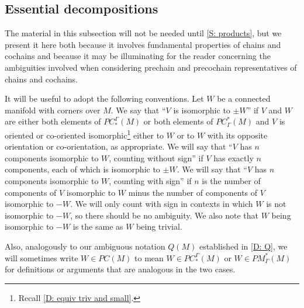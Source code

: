 \begin{comment}
	For the third product, we have by Joyce's convention that \red{I'm not getting a simple description of this because of Joyce's desription.
		Note that it requires using a specific identification of $TV \oplus TW$ with $TP \oplus TM$.
		I compute that even if we use identify $TM = \nu W \oplus TP \oplus \nu V$, $TV = \nu W \oplus TP$, and $TW = TP \oplus \nu V \oplus TP$ consistently, there's a sign of $(-1)^{m-w}$ from the determinant of Joyce's isomorphism, and then he enforces another factor of $(-1)^{mw}$ by hand.
		Yuck.
		And this is before comparing the actual orientations of things - yuck.
		We'll have to think some more about this.
	}.
\end{comment}


\subsection{Essential decompositions}\label{S: essential decomp}

The material in this subsection will not be needed until \cref{S: products}, but we present it here both because it involves fundamental properties of chains and cochains and because it may be illuminating for the reader concerning the ambiguities involved when considering prechain and precochain representatives of chains and cochains.


It will be useful to adopt the following conventions.
Let $W$ be a connected manifold with corners over $M$.
We say that ``$V$ is isomorphic to $\pm W$'' if $V$ and $W$ are either both elements of $PC_*^\Gamma(M)$ or both elements of $PC^*_\Gamma(M)$ and $V$ is oriented or co-oriented isomorphic\footnote{Recall \cref{D: equiv triv and small}.} either to $W$ or to $W$ with its opposite orientation or co-orientation, as appropriate.
We will say that ``$V$ has $n$ components isomorphic to $W$, counting without sign'' if $V$ has exactly $n$ components, each of which is isomorphic to $\pm W$.
We will say that ``$V$ has $n$ components isomorphic to $W$, counting with sign'' if $n$ is the number of components of $V$ isomorphic to $W$ minus the number of components of $V$ isomorphic to $-W$.
We will only count with sign in contexts in which $W$ is not isomorphic to $-W$, so there should be no ambiguity.
We also note that $W$ being isomorphic to $-W$ is the same as $W$ being trivial.

Also, analogously to our ambiguous notation $Q(M)$ established in \cref{D: Q}, we will sometimes write $W \in PC(M)$ to mean $W \in PC^\Gamma_*(M)$ or $W \in PM_\Gamma^*(M)$ for definitions or arguments that are analogous in the two cases.


